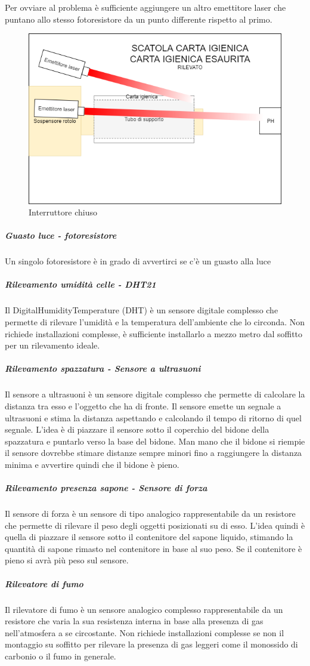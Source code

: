 \documentclass[12pt]{article}
\begin{document}
Per ovviare al problema è sufficiente aggiungere un altro emettitore laser che puntano allo stesso fotoresistore da un punto differente rispetto al primo.
 \begin{figure}[h!]
\centering
	\includegraphics[scale=0.55]{img/parteLocale/SoluzioneDeformazione.png}  
    \caption{Interruttore chiuso}
\end{figure}
\subparagraph{Guasto luce - fotoresistore}
Un singolo fotoresistore è in grado di avvertirci se c'è un guasto alla luce

\subparagraph{Rilevamento umidità celle - DHT21}
Il DigitalHumidityTemperature (DHT) è un sensore digitale complesso che permette di rilevare l'umidità e la temperatura dell'ambiente che lo circonda. Non richiede installazioni complesse, è sufficiente installarlo a mezzo metro dal soffitto per un rilevamento ideale.
\subparagraph{Rilevamento spazzatura - Sensore a ultrasuoni}
Il sensore a ultrasuoni è un sensore digitale complesso che permette di calcolare la distanza tra esso e l'oggetto che ha di fronte. Il sensore emette un segnale a ultrasuoni e stima la distanza aspettando e calcolando il tempo di ritorno di quel segnale.
L'idea è di piazzare il sensore sotto il coperchio del bidone della spazzatura e puntarlo verso la base del bidone. Man mano che il bidone si riempie il sensore dovrebbe stimare distanze sempre minori fino a raggiungere la distanza minima e avvertire quindi che il bidone è pieno.
\subparagraph{Rilevamento presenza sapone - Sensore di forza}
Il sensore di forza è un sensore di tipo analogico rappresentabile da un resistore che permette di rilevare il peso degli oggetti posizionati su di esso. L'idea quindi è quella di piazzare il sensore sotto il contenitore del sapone liquido, stimando la quantità di sapone rimasto nel contenitore in base al suo peso. Se il contenitore è pieno si avrà più peso sul sensore. 
\subparagraph{Rilevatore di fumo}
Il rilevatore di fumo è un sensore analogico complesso rappresentabile da un resistore che varia la sua resistenza interna in base alla presenza di gas nell'atmosfera a se circostante. Non richiede installazioni complesse se non il montaggio su soffitto per rilevare la presenza di gas leggeri come il monossido di carbonio o il fumo in generale.
\end{document}
